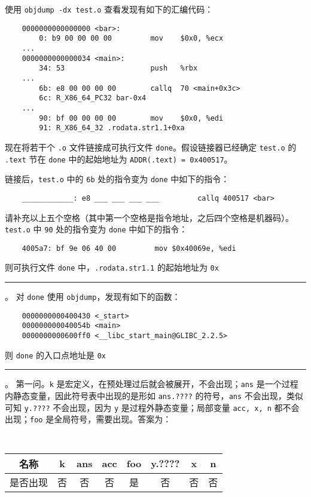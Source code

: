 \begin{problems}
        \qn 使用 \verb|objdump -dx test.o| 查看发现有如下的汇编代码：
        \begin{verbatim}
    0000000000000000 <bar>:
        0: b9 00 00 00 00         mov    $0x0, %ecx
    ...
    0000000000000034 <main>:
        34: 53                    push   %rbx
    ...
        6b: e8 00 00 00 00        callq  70 <main+0x3c>
        6c: R_X86_64_PC32 bar-0x4
    ...
        90: bf 00 00 00 00        mov    $0x0, %edi
        91: R_X86_64_32 .rodata.str1.1+0xa
        \end{verbatim}
        现在将若干个 \verb|.o| 文件链接成可执行文件 \verb|done|。假设链接器已经确定 \verb|test.o| 的 \verb|.text| 节在 \verb|done| 中的起始地址为 \verb|ADDR(.text) = 0x400517|。

        \subqn 链接后，\verb|test.o| 中的 \verb|6b| 处的指令变为 \verb|done| 中如下的指令：
        \begin{verbatim}
    ____________: e8 ___ ___ ___ ___         callq 400517 <bar>
        \end{verbatim}
        请补充以上五个空格（其中第一个空格是指令地址，之后四个空格是机器码）。
        \subqn \verb|test.o| 中 \verb|90| 处的指令变为 \verb|done| 中如下的指令：
        \begin{verbatim}
    4005a7: bf 9e 06 40 00         mov $0x40069e, %edi
        \end{verbatim}
        则可执行文件 \verb|done| 中，\verb|.rodata.str1.1| 的起始地址为 \verb|0x|\rule{2.5cm}{0.25mm}。
        \qn 对 \verb|done| 使用 \verb|objdump|，发现有如下的函数：
        \begin{verbatim}
    0000000000400430 <_start>
    000000000040054b <main>
    0000000000600ff0 <__libc_start_main@GLIBC_2.2.5>
        \end{verbatim}
        则 \verb|done| 的入口点地址是 \verb|0x|\rule{2.5cm}{0.25mm}。
        \sol 第一问。\verb|k| 是宏定义，在预处理过后就会被展开，不会出现；\verb|ans| 是一个过程内静态变量，因此符号表中出现的是形如 \verb|ans.????| 的符号，\verb|ans| 不会出现，类似可知 \verb|y.????| 不会出现，因为 \verb|y| 是过程外静态变量；局部变量 \verb|acc, x, n| 都不会出现；\verb|foo| 是全局符号，需要出现。答案为：
        \begin{table}[H]
            \tt
            \centering
            \begin{tabular}{|c|c|c|c|c|c|c|c|}
                \hline
                名称 & k & ans & acc & foo & y.???? & x & n \\ \hline
                是否出现 & 否 & 否 & 否 & 是 & 否 & 否 & 否 \\ \hline
            \end{tabular}
        \end{table}


\end{problems}
